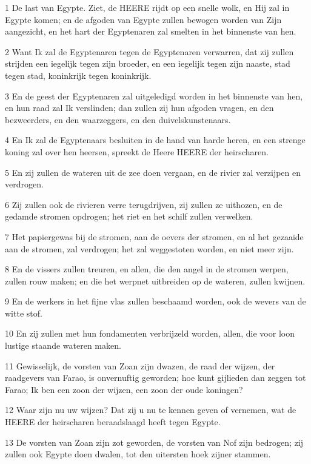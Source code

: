 \par 1 De last van Egypte. Ziet, de HEERE rijdt op een snelle wolk, en Hij zal in Egypte komen; en de afgoden van Egypte zullen bewogen worden van Zijn aangezicht, en het hart der Egyptenaren zal smelten in het binnenste van hen.
\par 2 Want Ik zal de Egyptenaren tegen de Egyptenaren verwarren, dat zij zullen strijden een iegelijk tegen zijn broeder, en een iegelijk tegen zijn naaste, stad tegen stad, koninkrijk tegen koninkrijk.
\par 3 En de geest der Egyptenaren zal uitgeledigd worden in het binnenste van hen, en hun raad zal Ik verslinden; dan zullen zij hun afgoden vragen, en den bezweerders, en den waarzeggers, en den duivelskunstenaars.
\par 4 En Ik zal de Egyptenaars besluiten in de hand van harde heren, en een strenge koning zal over hen heersen, spreekt de Heere HEERE der heirscharen.
\par 5 En zij zullen de wateren uit de zee doen vergaan, en de rivier zal verzijpen en verdrogen.
\par 6 Zij zullen ook de rivieren verre terugdrijven, zij zullen ze uithozen, en de gedamde stromen opdrogen; het riet en het schilf zullen verwelken.
\par 7 Het papiergewas bij de stromen, aan de oevers der stromen, en al het gezaaide aan de stromen, zal verdrogen; het zal weggestoten worden, en niet meer zijn.
\par 8 En de vissers zullen treuren, en allen, die den angel in de stromen werpen, zullen rouw maken; en die het werpnet uitbreiden op de wateren, zullen kwijnen.
\par 9 En de werkers in het fijne vlas zullen beschaamd worden, ook de wevers van de witte stof.
\par 10 En zij zullen met hun fondamenten verbrijzeld worden, allen, die voor loon lustige staande wateren maken.
\par 11 Gewisselijk, de vorsten van Zoan zijn dwazen, de raad der wijzen, der raadgevers van Farao, is onvernuftig geworden; hoe kunt gijlieden dan zeggen tot Farao; Ik ben een zoon der wijzen, een zoon der oude koningen?
\par 12 Waar zijn nu uw wijzen? Dat zij u nu te kennen geven of vernemen, wat de HEERE der heirscharen beraadslaagd heeft tegen Egypte.
\par 13 De vorsten van Zoan zijn zot geworden, de vorsten van Nof zijn bedrogen; zij zullen ook Egypte doen dwalen, tot den uitersten hoek zijner stammen.
